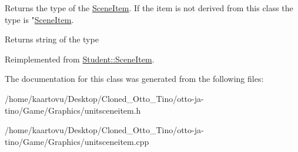 Returns the type of the \hyperlink{class_student_1_1_scene_item}{Scene\-Item}. If the item is not derived from this class the type is "\hyperlink{class_student_1_1_scene_item}{Scene\-Item}. 

\begin{DoxyReturn}{Returns}
string of the type 
\end{DoxyReturn}


Reimplemented from \hyperlink{class_student_1_1_scene_item_abeddbd7b240ebfa74579be94de8278a8}{Student\-::\-Scene\-Item}.



The documentation for this class was generated from the following files\-:\begin{DoxyCompactItemize}
\item 
/home/kaartovu/\-Desktop/\-Cloned\-\_\-\-Otto\-\_\-\-Tino/otto-\/ja-\/tino/\-Game/\-Graphics/unitsceneitem.\-h\item 
/home/kaartovu/\-Desktop/\-Cloned\-\_\-\-Otto\-\_\-\-Tino/otto-\/ja-\/tino/\-Game/\-Graphics/unitsceneitem.\-cpp\end{DoxyCompactItemize}
